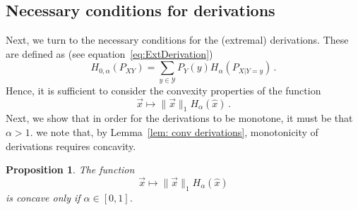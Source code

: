 \documentclass[aps,pra,11pt,onecolumn,nofootinbib,tightenlines]{revtex4-2}
\newtheorem{proposition}[theorem]{Proposition}
\theoremstyle{definition}
\newcommand{\Y}{\mathcal{Y}}
\begin{document}
\subsection{Necessary conditions for derivations}
\label{sec: necessary derivations}
Next, we turn to the necessary conditions for the (extremal) derivations.
These are defined as (see equation~\eqref{eq:ExtDerivation})
 \begin{equation}
    H_{0,\alpha}(P_{XY}) = \sum_{y \in \Y} P_Y(y)H_\alpha(P_{X|Y=y}) \,.
 \end{equation} 
 Hence, it is sufficient to consider the convexity properties of the function
\begin{equation}
      \vec{x} \longmapsto \|\vec{x}\|_1 H_\alpha(\hat{x}) \,.
 \end{equation}
Next, we show that in order for the derivations to be monotone, it must be that
$\alpha>1$. we note that, by Lemma~\ref{lem: conv derivations}, monotonicity of derivations requires concavity.
\begin{proposition}
 \label{prop: prop measure deriv}
The function
 \begin{equation}
     \vec{x} \longmapsto \|\vec{x}\|_1  H_\alpha(\hat{x}) 
\end{equation}
     is concave only if $\alpha \in [0,1]$.
 \end{proposition}
\end{document}
